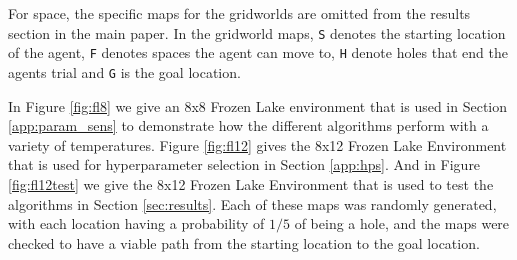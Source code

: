             For space, the specific maps for the gridworlds are omitted from the results section in the main paper. In the gridworld maps, \texttt{S} denotes the starting location of the agent, \texttt{F} denotes spaces the agent can move to, \texttt{H} denote holes that end the agents trial and \texttt{G} is the goal location. 
        
            In Figure \ref{fig:fl8} we give an 8x8 Frozen Lake environment that is used in Section \ref{app:param_sens} to demonstrate how the different algorithms perform with a variety of temperatures. Figure \ref{fig:fl12} gives the 8x12 Frozen Lake Environment that is used for hyperparameter selection in Section \ref{app:hps}. And in Figure \ref{fig:fl12test} we give the 8x12 Frozen Lake Environment that is used to test the algorithms in Section \ref{sec:results}. Each of these maps was randomly generated, with each location having a probability of $1/5$ of being a hole, and the maps were checked to have a viable path from the starting location to the goal location.
        
